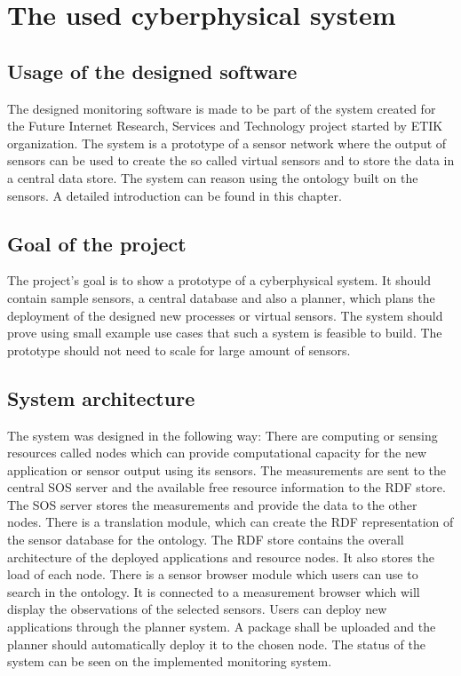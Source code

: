 \chapter{The used cyberphysical system}
\section{Usage of the designed software}

The designed monitoring software is made to be part of the system created for the Future Internet Research, Services and Technology project started by ETIK organization. The system is a prototype of a sensor network where the output of sensors can be used to create the so called virtual sensors and to store the data in a central data store. The system can reason using the ontology built on the sensors. A detailed introduction can be found in this chapter.

\section{Goal of the project}

The project's goal is to show a prototype of a cyberphysical system. It should contain sample sensors, a central database and also a planner, which plans the deployment of the designed new processes or virtual sensors. The system should prove using small example use cases that such a system is feasible to build. The prototype should not need to scale for large amount of sensors.

\section{System architecture}

The system was designed in the following way: 
There are computing or sensing resources called nodes which can provide computational capacity for the new application or sensor output using its sensors. The measurements are sent to the central SOS server and the available free resource information to the RDF store.
The SOS server stores the measurements and provide the data to the other nodes. There is a translation module, which can create the RDF representation of the sensor database for the ontology. 
The RDF store contains the overall architecture of the deployed applications and resource nodes. It also stores the load of each node. 
There is a sensor browser module which users can use to search in the ontology. It is connected to a measurement browser which will display the observations of the selected sensors. 
Users can deploy new applications through the planner system. A package shall be uploaded and the planner should automatically deploy it to the chosen node. 
The status of the system can be seen on the implemented monitoring system.


